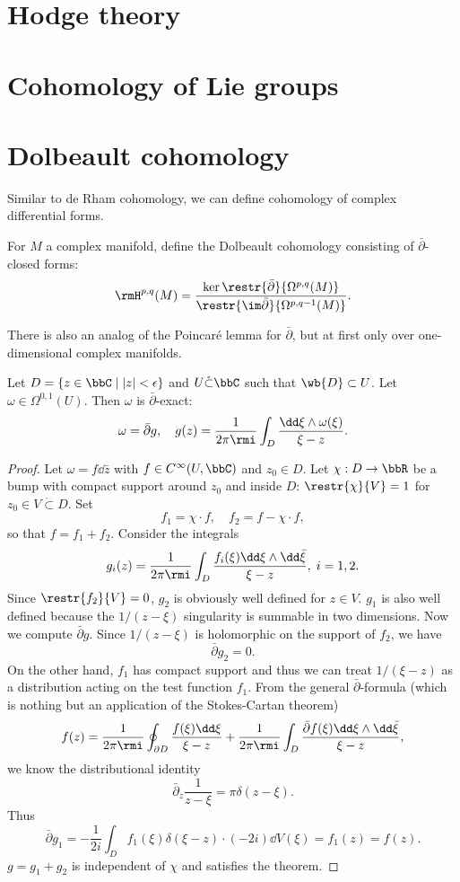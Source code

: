 \section{Hodge theory}


\section{Cohomology of Lie groups}


\section{Dolbeault cohomology}

Similar to de Rham cohomology, we can define cohomology of complex differential forms.

\begin{defn}
    For $M$ a complex manifold, define the Dolbeault cohomology consisting of $\bar\partial$-closed forms:
    \[\rmH^{p,q}(M)=\frac{\ker \restr{\bar\partial}{\Omega^{p,q}(M)}}{\restr{\im\bar\partial}{\Omega^{p,q-1}(M)}}.\]
\end{defn}

There is also an analog of the Poincar\'e lemma for $\bar\partial$, but at first only over one-dimensional complex manifolds.

\begin{lem}
    Let $D=\{z\in\bbC\mid |z|<\epsilon\}$ and $U\mathring\subset \bbC$ such that $\wb{D}\subset U$. Let $\omega\in \Omega^{0,1}(U)$. Then $\omega$ is $\bar\partial$-exact:
    \[\omega=\bar\partial g,\quad g(z)=\frac{1}{2\pi\rmi }\int_{D}\frac{\dd\xi\wedge \omega(\xi)}{\xi-z}.\]
\end{lem}
\begin{proof}
    Let $\omega=f\dd\bar z$ with $f\in C^\infty(U,\bbC)$ and $z_0\in D$. Let $\chi:D\to\bbR$ be a bump with compact support around $z_0$ and inside $D$: $\restr{\chi}{V}=1$ for $z_0\in V\mathring\subset D$. Set
    \[f_1=\chi\cdot f,\quad f_2=f-\chi\cdot f,\]
    so that $f=f_1+f_2$. Consider the integrals
    \[g_i(z)=\frac{1}{2\pi\rmi }\int_{D}\frac{f_i(\xi)\dd\xi\wedge \dd\bar\xi}{\xi-z},\; i=1,2.\]
    Since $\restr{f_2}{V}=0$, $g_2$ is obviously well defined for $z\in V$. $g_1$ is also well defined because the $1/(z-\xi)$ singularity is summable in two dimensions. Now we compute $\bar\partial g$. Since $1/(z-\xi)$ is holomorphic on the support of $f_2$, we have
    \[\bar\partial g_2=0.\]
    On the other hand, $f_1$ has compact support and thus we can treat $1/(\xi-z)$ as a distribution acting on the test function $f_1$. From the general $\bar\partial$-formula (which is nothing but an application of the Stokes-Cartan theorem)
    \[f(z)=\frac{1}{2\pi\rmi }\oint_{\partial D}\frac{f(\xi)\dd\xi}{\xi-z}+\frac{1}{2\pi\rmi }\int_D\frac{\bar\partial f(\xi)\dd\xi\wedge\dd\bar \xi}{\xi-z},\]
    we know the distributional identity
    \[\bar\partial_z \frac{1}{z-\xi}=\pi\delta(z-\xi).\]
    Thus 
    \[\bar\partial g_1=-\frac{1}{2 i}\int_D f_1(\xi)\delta(\xi-z)\cdot (-2i)\dd V(\xi)=f_1(z)=f(z).\]
    $g=g_1+g_2$ is independent of $\chi$ and satisfies the theorem.
\end{proof}

